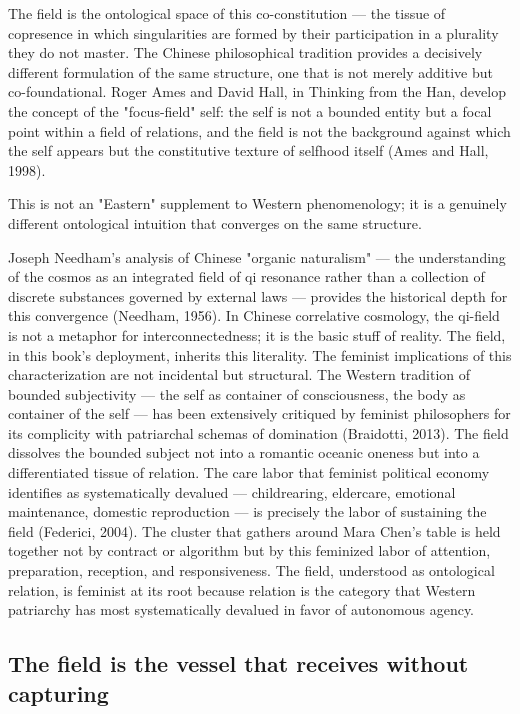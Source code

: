 The field is the ontological space of this co-constitution — the tissue of copresence in which singularities are formed by their participation in a plurality they do not master. The Chinese philosophical tradition provides a decisively different formulation of the same structure, one that is not merely additive but co-foundational. Roger Ames and David Hall, in Thinking from the Han, develop the concept of the "focus-field" self: the self is not a bounded entity but a focal point within a field of relations, and the field is not the background against which the self appears but the constitutive texture of selfhood itself (Ames and Hall, 1998).

This is not an "Eastern" supplement to Western phenomenology; it is a genuinely different ontological intuition that converges on the same structure.

Joseph Needham's analysis of Chinese "organic naturalism" — the understanding of the cosmos as an integrated field of qi resonance rather than a collection of discrete substances governed by external laws — provides the historical depth for this convergence (Needham, 1956). In Chinese correlative cosmology, the qi-field is not a metaphor for interconnectedness; it is the basic stuff of reality. The field, in this book's deployment, inherits this literality. The feminist implications of this characterization are not incidental but structural. The Western tradition of bounded subjectivity — the self as container of consciousness, the body as container of the self — has been extensively critiqued by feminist philosophers for its complicity with patriarchal schemas of domination (Braidotti, 2013). The field dissolves the bounded subject not into a romantic oceanic oneness but into a differentiated tissue of relation. The care labor that feminist political economy identifies as systematically devalued — childrearing, eldercare, emotional maintenance, domestic reproduction — is precisely the labor of sustaining the field (Federici, 2004). The cluster that gathers around Mara Chen's table is held together not by contract or algorithm but by this feminized labor of attention, preparation, reception, and responsiveness. The field, understood as ontological relation, is feminist at its root because relation is the category that Western patriarchy has most systematically devalued in favor of autonomous agency.

\subsection{The field is the vessel that receives without capturing}

